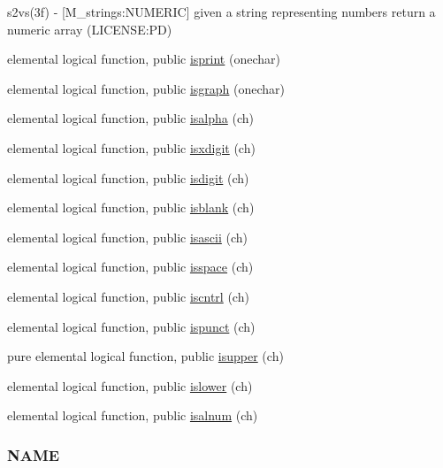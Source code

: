 \begin{DoxyCompactItemize}
\begin{DoxyCompactList}
s2vs(3f) -\/ \mbox{[}M\+\_\+strings\+:N\+U\+M\+E\+R\+IC\mbox{]} given a string representing numbers return a numeric array (L\+I\+C\+E\+N\+SE\+:PD) \end{DoxyCompactList}\item 
elemental logical function, public \mbox{\hyperlink{namespacem__strings_a267f2fde729a75496c82a64754a91e54}{isprint}} (onechar)
\item 
elemental logical function, public \mbox{\hyperlink{namespacem__strings_a84c80fdeeba0679488ed8ad8d37e53c5}{isgraph}} (onechar)
\item 
elemental logical function, public \mbox{\hyperlink{namespacem__strings_a5cf6d7fbd1b3ea17e37c6213c6ba0fdb}{isalpha}} (ch)
\item 
elemental logical function, public \mbox{\hyperlink{namespacem__strings_a9953d1e400bedceab6a06910c6cdf208}{isxdigit}} (ch)
\item 
elemental logical function, public \mbox{\hyperlink{namespacem__strings_a9f5f98a6c93e21618a16d98a5de2debc}{isdigit}} (ch)
\item 
elemental logical function, public \mbox{\hyperlink{namespacem__strings_aebb074d3971c0b93e39d1cfaa45658d8}{isblank}} (ch)
\item 
elemental logical function, public \mbox{\hyperlink{namespacem__strings_afb63e9fefbc04e4e9a2ec4df4334078c}{isascii}} (ch)
\item 
elemental logical function, public \mbox{\hyperlink{namespacem__strings_ab32380c29451e56395153155c1632d74}{isspace}} (ch)
\item 
elemental logical function, public \mbox{\hyperlink{namespacem__strings_a4821cb5a5c4024c9dc6dd159300034ca}{iscntrl}} (ch)
\item 
elemental logical function, public \mbox{\hyperlink{namespacem__strings_a8712164e1f5fd717bdea854a3f067619}{ispunct}} (ch)
\item 
pure elemental logical function, public \mbox{\hyperlink{namespacem__strings_ac98536a1b69026cd5373dfff489f7733}{isupper}} (ch)
\item 
elemental logical function, public \mbox{\hyperlink{namespacem__strings_a9de5290748f02f575f3b7b859ff074ed}{islower}} (ch)
\item 
elemental logical function, public \mbox{\hyperlink{namespacem__strings_ad8fd9bbf618bdba2c3ac9fb3c8174362}{isalnum}} (ch)
\begin{DoxyCompactList}\small\item\em \subsubsection*{N\+A\+ME}


\end{DoxyCompactList}
\end{DoxyCompactItemize}
